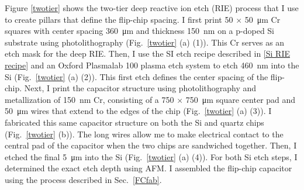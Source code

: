\documentclass[double,12pt,1in,seploa]{beavtex}
\begin{document}
Figure \ref{twotier} shows the two-tier deep reactive ion etch (RIE) process that I use to create pillars that define the flip-chip spacing. I first print 50 $\times$ \SI{50}{\micro\meter} Cr squares with center spacing \SI{360}{\micro\meter} and thickness \SI{150}{\nano\meter} on a p-doped Si substrate using photolithography (Fig.\ \ref{twotier} (a) (1)). This Cr serves as an etch mask for the deep RIE. Then, I use the SI etch recipe described in \ref{Si RIE recipe} and an Oxford Plasmalab 100 plasma etch system to etch \SI{460}{\nano\meter} into the Si (Fig.\ \ref{twotier} (a) (2)). This first etch defines the center spacing of the flip-chip. Next, I print the capacitor structure using photolithography and metallization of \SI{150}{\nano\meter} Cr, consisting of a 750 $\times$ \SI{750}{\micro\meter} square center pad and \SI{50}{\micro\meter} wires that extend to the edges of the chip (Fig.\ \ref{twotier} (a) (3)). I fabricated this same capacitor structure on both the Si and quartz chips (Fig.\ \ref{twotier} (b)). The long wires allow me to make electrical contact to the central pad of the capacitor when the two chips are sandwiched together. Then, I etched the final \SI{5}{\micro\meter} into the Si (Fig.\ \ref{twotier} (a) (4)). For both Si etch steps, I determined the exact etch depth using AFM. I assembled the flip-chip capacitor using the process described in Sec.\ \ref{FCfab}. 
 

\end{document}

